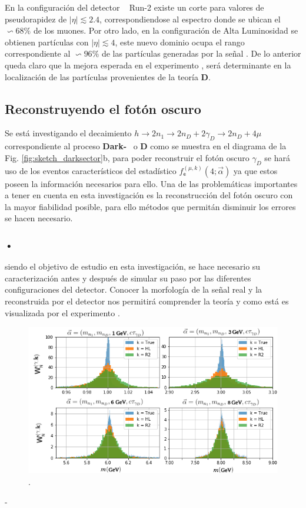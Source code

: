 En la configuración del detector \CMS ~ Run-2 existe un corte para valores de pseudorapidez de $|\eta|\lesssim 2.4$, correspondiendose al espectro donde se ubican el $\backsim 68\%$ de los muones. Por otro lado, en la configuración de Alta Luminosidad se obtienen partículas con $|\eta|\lesssim 4$, este nuevo dominio ocupa el rango correspondiente al $\backsim 96\%$ de las partículas generadas por la señal \MC. De lo anterior queda claro que la mejora esperada en el experimento \CMS, será determinante en la localización de las partículas provenientes de la teoría \MSSM\textbf{D}.



\subsection{Reconstruyendo el fotón oscuro}
Se está investigando el decaimiento $h \rightarrow 2n_1 \rightarrow 2n_D + 2\gamma_D \rightarrow 2n_D + 4\mu$ correspondiente al proceso \textbf{Dark-}\SUSY ~ o \MSSM\textbf{D} como se muestra en el diagrama de la Fig. \ref{fig:sketch_darksector}b, para poder reconstruir el fotón oscuro $\gamma_D$ se hará uso de los eventos característicos del estadístico $f^{(\mu, k)}_\textsf{e} (4;\vec{\alpha})$ ya que estos poseen la información necesarios para ello. Una de las problemáticas importantes a tener en cuenta en esta investigación es la reconstrucción del fotón oscuro con la mayor fiabilidad posible, para ello métodos que permitán disminuir los errores se hacen necesario. 

\subsubsection{•}
siendo el objetivo de estudio en esta investigación, se hace necesario su caracterización antes y después de simular su paso por las diferentes configuraciones del detector. Conocer la morfología de la señal real y la reconstruida por el detector nos permitirá comprender la teoría y como está es visualizada por el experimento \CMS.

\begin{figure}[!t]
\centering
\includegraphics[width=.95\textwidth]{Simulacion/imagenes/foton_mass.png}
\caption{.}
\label{mass_inv}
\end{figure}-

